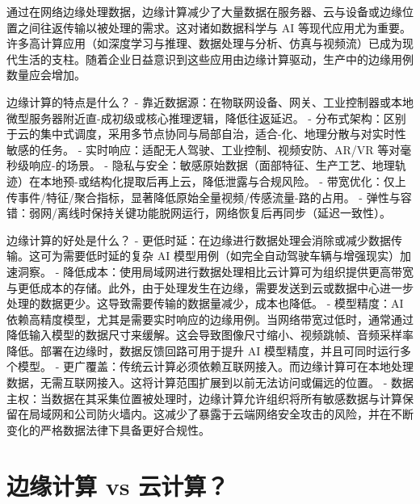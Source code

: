 通过在网络边缘处理数据，边缘计算减少了大量数据在服务器、云与设备或边缘位置之间往返传输以被处理的需求。这对诸如数据科学与
AI
等现代应用尤为重要。许多高计算应用（如深度学习与推理、数据处理与分析、仿真与视频流）已成为现代生活的支柱。随着企业日益意识到这些应用由边缘计算驱动，生产中的边缘用例数量应会增加。

边缘计算的特点是什么？ -
靠近数据源：在物联网设备、网关、工业控制器或本地微型服务器附近直-成初级或核心推理逻辑，降低往返延迟。
-
分布式架构：区别于云的集中式调度，采用多节点协同与局部自治，适合-化、地理分散与对实时性敏感的任务。
- 实时响应：适配无人驾驶、工业控制、视频安防、AR/VR
等对毫秒级响应-的场景。 -
隐私与安全：敏感原始数据（面部特征、生产工艺、地理轨迹）在本地预-或结构化提取后再上云，降低泄露与合规风险。
-
带宽优化：仅上传事件/特征/聚合指标，显著降低原始全量视频/传感流量-路的占用。
-
弹性与容错：弱网/离线时保持关键功能脱网运行，网络恢复后再同步（延迟一致性）。

边缘计算的好处是什么？ -
更低时延：在边缘进行数据处理会消除或减少数据传输。这可为需要低时延的复杂
AI 模型用例（如完全自动驾驶车辆与增强现实）加速洞察。 -
降低成本：使用局域网进行数据处理相比云计算可为组织提供更高带宽与更低成本的存储。此外，由于处理发生在边缘，需要发送到云或数据中心进一步处理的数据更少。这导致需要传输的数据量减少，成本也降低。
- 模型精度：AI
依赖高精度模型，尤其是需要实时响应的边缘用例。当网络带宽过低时，通常通过降低输入模型的数据尺寸来缓解。这会导致图像尺寸缩小、视频跳帧、音频采样率降低。部署在边缘时，数据反馈回路可用于提升
AI 模型精度，并且可同时运行多个模型。 -
更广覆盖：传统云计算必须依赖互联网接入。而边缘计算可在本地处理数据，无需互联网接入。这将计算范围扩展到以前无法访问或偏远的位置。
-
数据主权：当数据在其采集位置被处理时，边缘计算允许组织将所有敏感数据与计算保留在局域网和公司防火墙内。这减少了暴露于云端网络安全攻击的风险，并在不断变化的严格数据法律下具备更好合规性。

\section{边缘计算 vs
云计算？}\label{ux8fb9ux7f18ux8ba1ux7b97-vs-ux4e91ux8ba1ux7b97}

